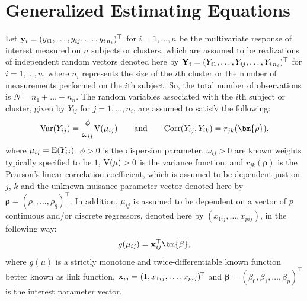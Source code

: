 \section{Generalized Estimating Equations}
Let ${\bf y}_i = (y_{i1},\ldots,y_{ij},\ldots,y_{i\,n_i})^{\top}$ for $i=1,\ldots,n$ be the multivariate response of interest measured on $n$ subjects or clusters, which are assumed to be realizations of
independent random vectors denoted here by ${\bf Y}_i = (Y_{i1},\ldots,Y_{ij},\ldots,Y_{i\,n_i})^{\top}$ for
$i=1,\dots,n$, where $n_i$ represents the size of the $i$th cluster or the number of measurements performed on the
$i$th subject. So, the total number of observations is $N=n_1+\ldots+n_n$. The random variables associated with the $i$th subject or cluster, given by $Y_{ij}$ for $j=1,\ldots,n_i$,
are assumed to satisfy the following:
$${\rm Var}(Y_{ij})=\dfrac{\phi}{\omega_{ij}}{\rm V}(\mu_{ij})\qquad\text{and}\qquad {\rm Corr}(Y_{ij},Y_{ik})=r_{jk}(\bm{\rho}),$$
where $\mu_{ij}={\rm E}(Y_{ij})$, $\phi>0$ is the dispersion parameter, $\omega_{ij}>0$ are known weights typically specified to be $1$, ${\rm V}(\mu)>0$ is the variance function, and $r_{jk}(\bm{\rho})$ is the Pearson's linear correlation coefficient, which is assumed to be dependent just on $j$, $k$ and the unknown nuisance parameter vector denoted here by $\bm{\rho}=(\rho_1,\ldots,\rho_q)^{\!\top}$. In addition, $\mu_{ij}$ is assumed to be dependent on a vector of $p$ continuous and/or discrete regressors,
denoted here by $(x_{1ij},\ldots,x_{pij})$, in the following way:
\begin{equation}\label{msc}
g(\mu_{ij})={\bf x}_{ij}^{\top}\bm{\beta},
\end{equation}
where $g(\mu)$ is a strictly monotone and twice-differentiable known function better known as link function, ${\bf x}_{ij}=(1,x_{1ij},\ldots,x_{pij})^{\!\top}$ and $\bm{\beta}=(\beta_0,\beta_1,\ldots,\beta_p)^{\top}$ is the interest parameter vector.\\

